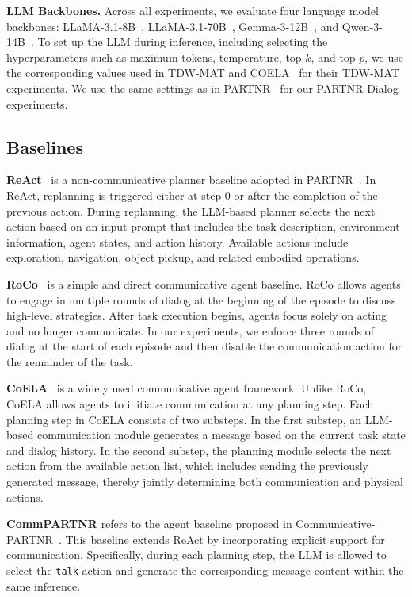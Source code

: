 \documentclass{article}
\theoremstyle{plain}
\theoremstyle{definition}
\theoremstyle{remark}
\begin{document}
\textbf{LLM Backbones.}
Across all experiments, we evaluate four language model backbones: LLaMA-3.1-8B~\cite{llama3}, LLaMA-3.1-70B~\cite{llama3}, Gemma-3-12B~\cite{gemma3}, and Qwen-3-14B~\cite{qwen3}. To set up the LLM during inference, including selecting the hyperparameters such as maximum tokens, temperature, top-$k$, and top-$p$, we use the corresponding values used in TDW-MAT and COELA~\cite{coela} for their TDW-MAT experiments. We use the same settings as in  PARTNR~\cite{partnr} for our PARTNR-Dialog experiments.

\subsection{Baselines}

\textbf{ReAct}~\cite{yao2022react} is a non-communicative planner baseline adopted in PARTNR~\cite{partnr}. In ReAct, replanning is triggered either at step 0 or after the completion of the previous action. During replanning, the LLM-based planner selects the next action based on an input prompt that includes the task description, environment information, agent states, and action history. Available actions include exploration, navigation, object pickup, and related embodied operations.

\textbf{RoCo}~\cite{roco} is a simple and direct communicative agent baseline. RoCo allows agents to engage in multiple rounds of dialog at the beginning of the episode to discuss high-level strategies. After task execution begins, agents focus solely on acting and no longer communicate. In our experiments, we enforce three rounds of dialog at the start of each episode and then disable the communication action for the remainder of the task.

\textbf{CoELA}~\cite{coela} is a widely used communicative agent framework. Unlike RoCo, CoELA allows agents to initiate communication at any planning step. Each planning step in CoELA consists of two substeps. In the first substep, an LLM-based communication module generates a message based on the current task state and dialog history. In the second substep, the planning module selects the next action from the available action list, which includes sending the previously generated message, thereby jointly determining both communication and physical actions.

\textbf{CommPARTNR} refers to the agent baseline proposed in Communicative-PARTNR~\cite{comm-partnr}. This baseline extends ReAct by incorporating explicit support for communication. Specifically, during each planning step, the LLM is allowed to select the \texttt{talk} action and generate the corresponding message content within the same inference.
\end{document}
